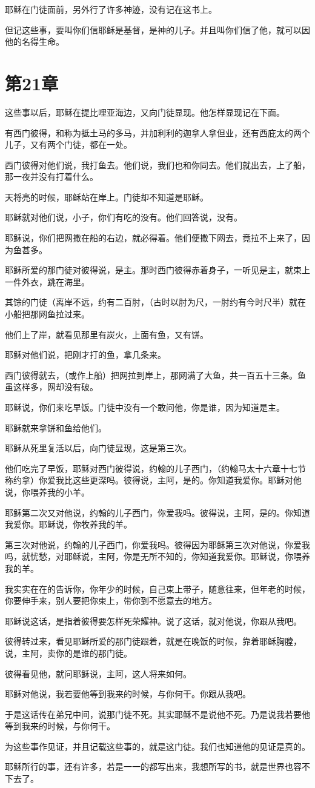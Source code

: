 \documentclass[12pt,oneside]{book}
\begin{document}
耶稣在门徒面前，另外行了许多神迹，没有记在这书上。

但记这些事，要叫你们信耶稣是基督，是神的儿子。并且叫你们信了他，就可以因他的名得生命。

\chapter{第21章}
这些事以后，耶稣在提比哩亚海边，又向门徒显现。他怎样显现记在下面。

有西门彼得，和称为抵土马的多马，并加利利的迦拿人拿但业，还有西庇太的两个儿子，又有两个门徒，都在一处。

西门彼得对他们说，我打鱼去。他们说，我们也和你同去。他们就出去，上了船，那一夜并没有打着什么。

天将亮的时候，耶稣站在岸上。门徒却不知道是耶稣。

耶稣就对他们说，小子，你们有吃的没有。他们回答说，没有。

耶稣说，你们把网撒在船的右边，就必得着。他们便撒下网去，竟拉不上来了，因为鱼甚多。

耶稣所爱的那门徒对彼得说，是主。那时西门彼得赤着身子，一听见是主，就束上一件外衣，跳在海里。

其馀的门徒（离岸不远，约有二百肘，（古时以肘为尺，一肘约有今时尺半）就在小船把那网鱼拉过来。

他们上了岸，就看见那里有炭火，上面有鱼，又有饼。

耶稣对他们说，把刚才打的鱼，拿几条来。

西门彼得就去，（或作上船）把网拉到岸上，那网满了大鱼，共一百五十三条。鱼虽这样多，网却没有破。

耶稣说，你们来吃早饭。门徒中没有一个敢问他，你是谁，因为知道是主。

耶稣就来拿饼和鱼给他们。

耶稣从死里复活以后，向门徒显现，这是第三次。

他们吃完了早饭，耶稣对西门彼得说，约翰的儿子西门，（约翰马太十六章十七节称约拿）你爱我比这些更深吗。彼得说，主阿，是的。你知道我爱你。耶稣对他说，你喂养我的小羊。

耶稣第二次又对他说，约翰的儿子西门，你爱我吗。彼得说，主阿，是的。你知道我爱你。耶稣说，你牧养我的羊。

第三次对他说，约翰的儿子西门，你爱我吗。彼得因为耶稣第三次对他说，你爱我吗，就忧愁，对耶稣说，主阿，你是无所不知的，你知道我爱你。耶稣说，你喂养我的羊。

我实实在在的告诉你，你年少的时候，自己束上带子，随意往来，但年老的时候，你要伸手来，别人要把你束上，带你到不愿意去的地方。

耶稣说这话，是指着彼得要怎样死荣耀神。说了这话，就对他说，你跟从我吧。

彼得转过来，看见耶稣所爱的那门徒跟着，就是在晚饭的时候，靠着耶稣胸膛，说，主阿，卖你的是谁的那门徒。

彼得看见他，就问耶稣说，主阿，这人将来如何。

耶稣对他说，我若要他等到我来的时候，与你何干。你跟从我吧。

于是这话传在弟兄中间，说那门徒不死。其实耶稣不是说他不死。乃是说我若要他等到我来的时候，与你何干。

为这些事作见证，并且记载这些事的，就是这门徒。我们也知道他的见证是真的。

耶稣所行的事，还有许多，若是一一的都写出来，我想所写的书，就是世界也容不下去了。


\backmatter
\end{document}
